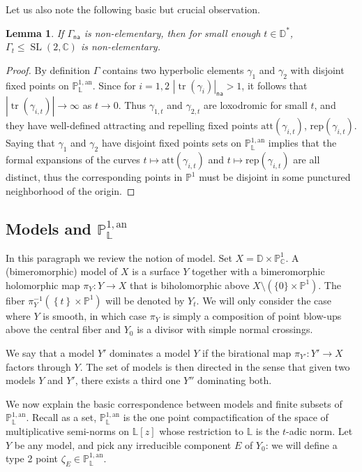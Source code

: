 \documentclass[10pt]{amsart}
\newtheorem{lemm}[theo]{Lemma}\newtheorem{prop}[theo]{Proposition}\newtheorem{coro}[theo]{Corollary}\newtheorem{conj}[theo]{Conjecture}
\theoremstyle{definition}\newtheorem{defi}[theo]{Definition}\newtheorem{rema}[theo]{Remark}\newtheorem{exam}[theo]{Example}\newtheorem{exem}[theo]{Example}\newtheorem{nota}[theo]{Notation}
\DeclareMathOperator{\tr}{tr}
\DeclareMathOperator{\SL}{SL}
\newcommand{\cc}{\mathbb{C}}
\newcommand{\dD}{\mathbb{D}}
\newcommand{\an}{\mathrm{an}}
\newcommand{\cv}{\rightarrow}
\newcommand{\set}[1]{\left\{#1\right\}}
\newcommand{\abs}[1]{\left\vert#1\right\vert}
\newcommand{\pu}{{\mathbb{P}^1}}
\newcommand{\PP}{\mathbb{P}}
\newcommand{\berkl}{\mathbb P^{1,\an}_{\Laurent}}
\newcommand{\Laurent}{\mathbb{L}}
\newcommand{\att}{\mathrm{att}}
\newcommand{\rep}{\mathrm{rep}}
\newcommand{\na}{\mathsf{na}}
\newcommand{\SLC}{\SL(2,\mathbb C)}
\newcommand{\inv}{^{-1}}
\begin{document}
Let us also note the following basic but crucial observation.

\begin{lemm}\label{lem:specialization NE}
If $\Gamma_\na$ is non-elementary, then for small enough $t\in \dD^*$, $\Gamma_t\leq \SLC$ is non-elementary.
\end{lemm}

\begin{proof}
By definition $\Gamma$ contains two hyperbolic elements $\gamma_1$ and $\gamma_2$ with disjoint fixed points on $\PP^{1,\an}_{\Laurent}$. Since for $i=1,2$ $\abs{\tr (\gamma_i)}_\na>1$, it follows that $\abs{\tr(\gamma_{i,t})} \to \infty$ as $t\cv 0$. Thus $\gamma_{1,t}$ and $\gamma_{2,t}$ are loxodromic for small $t$, and they have well-defined attracting and repelling fixed points $\att(\gamma_{i,t})$, $\rep(\gamma_{i,t})$. Saying that $\gamma_1$ and $\gamma_2$ have disjoint fixed points sets on $\berkl$ implies that the formal expansions of the curves $t\mapsto \att(\gamma_{i,t})$ and $t\mapsto \rep(\gamma_{i,t})$ are all distinct, thus the corresponding points in $\pu$ must be disjoint in some punctured neighborhood of the origin.
\end{proof}

\subsection{Models and \texorpdfstring{$\PP^{1,\an}_{\Laurent}$}{PP1, an Laurent}} \label{subs:models}

In this paragraph we review the notion of model. Set $X = \dD\times \PP^1_\cc$. A (bimeromorphic) model of $X$ is a surface $Y$ together with a bimeromorphic holomorphic map $\pi_Y:Y\to X$ that is biholomorphic above $X\setminus (\{0\}\times \pu)$. The fiber $\pi_Y\inv(\set{t}\times \pu)$ will be denoted by $Y_t$. We will only consider the case where $Y$ is smooth, in which case $\pi_Y$ is simply a composition of point blow-ups above the central fiber and $Y_0$ is a divisor with simple normal crossings.

We say that a model $Y'$ dominates a model $Y$ if the birational map $\pi_{Y'}:Y'\cv X$ factors through $Y$. The set of models is then directed in the sense that given two models $Y$ and $Y'$, there exists a third one $Y''$ dominating both.

We now explain the basic correspondence between models and finite subsets of $\berkl$. Recall as a set, $\PP^{1,\an}_{\Laurent}$ is the one point compactification of the space of multiplicative semi-norms on $\Laurent[z]$ whose restriction to $\Laurent$ is the $t$-adic norm. Let $Y$ be any model, and pick any irreducible component $E$ of $Y_0$: we will define a type 2 point $\zeta_E \in \PP^{1,\an}_{\Laurent}$.
\end{document}
